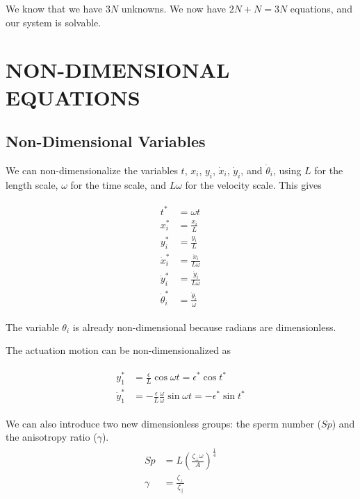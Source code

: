 \documentclass[12pt,letterpaper,titlepage]{article}
\begin{document}
We know that we have $3N$ unknowns. We now have $2N + N = 3N$ equations, and our system is solvable.

\newpage
\section{NON-DIMENSIONAL EQUATIONS}
\subsection{Non-Dimensional Variables}
We can non-dimensionalize the variables $t$, $x_i$, $y_i$, $\dot{x}_i$, $\dot{y}_i$, and $\dot{\theta}_i$, using $L$ for the length scale, $\omega$ for the time scale, and $L \omega$ for the velocity scale. This gives

\begin{align}
\begin{split}
t^* &= \omega t \\
x_i^*&= \frac{x_i}{L} \\
y_i^* &= \frac{y_i}{L} \\
\dot{x}_i^* &= \frac{\dot{x}_i}{L \omega} \\
\dot{y}_i^* &= \frac{\dot{y}_i}{L \omega} \\
\dot{\theta}_i^* &= \frac{\dot{\theta}_i}{\omega}
\end{split}
\end{align}

The variable $\theta_i$ is already non-dimensional because radians are dimensionless.

The actuation motion can be non-dimensionalized as

\begin{align}
\begin{split}
y_1^* &= \frac{\epsilon}{L} \cos \omega t = \epsilon^* \cos t^* \\
\dot{y}_1^* &= - \frac{\epsilon}{L} \frac{\omega}{\omega} \sin \omega t = - \epsilon^* \sin t^*
\end{split}
\end{align}

We can also introduce two new dimensionless groups: the sperm number ($Sp$) and the anisotropy ratio ($\gamma$).
\begin{align}
\begin{split}
Sp &= L(\frac{\zeta_{\bot} \omega}{A})^\frac{1}{4} \\
\gamma &= \frac{\zeta_{\bot}}{\zeta_{\parallel}}
\end{split}
\end{align}
\end{document}
